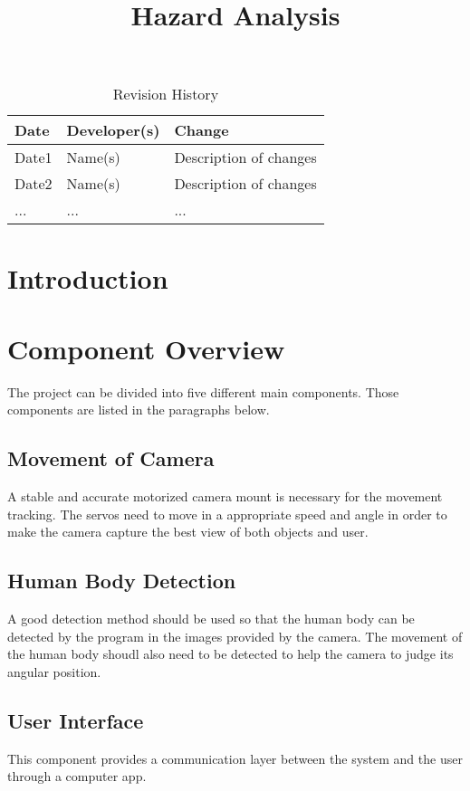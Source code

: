\documentclass{article}
\title{Hazard Analysis\\\progname}
\author{\authname}
\date{}
\begin{document}
\begin{table}[hp]
\caption{Revision History} \label{TblRevisionHistory}
\begin{tabularx}{\textwidth}{llX}
\toprule
\textbf{Date} & \textbf{Developer(s)} & \textbf{Change}\\
\midrule
Date1 & Name(s) & Description of changes\\
Date2 & Name(s) & Description of changes\\
... & ... & ...\\
\bottomrule
\end{tabularx}
\end{table}

\newpage

\maketitle

\newpage


\tableofcontents

\newpage
\section{Introduction}

\section{Component Overview}
The project can be divided into five different main components. Those components are listed in the paragraphs below. 
\subsection{Movement of Camera}
A stable and accurate motorized camera mount is necessary for the movement tracking. The servos need to move in a appropriate speed and angle in order to make the camera capture the best view of both objects and user.
\subsection{Human Body Detection}
A good detection method should be used so that the human body can be detected by the program in the images provided by the camera. The movement of the human body shoudl also need to be detected to help the camera to judge its angular position. 
\subsection{User Interface}
This component provides a communication layer between the system and the user through a computer app.
\end{document}
